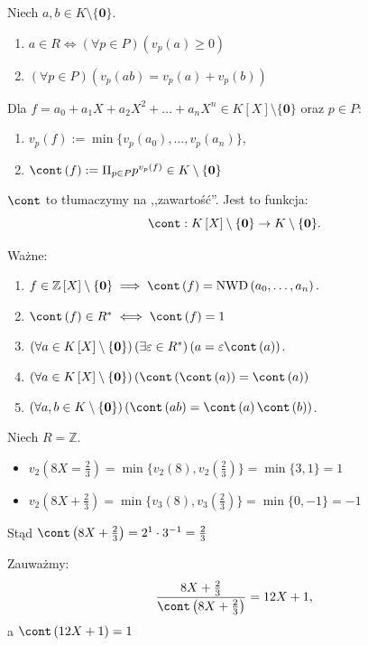 \begin{lemma}
	Niech $a,b \in K\setminus \{\mathbf{0}\} $.
	\begin{enumerate}[label=\arabic*)]
		\item $a\in R \iff \left(\forall p \in P \right)\left( v_{p}(a) \ge 0 \right)  $ 
		\item $\left(\forall p \in P \right)\left( v_{p}\left( ab \right) = v_{p}(a) + v_{p}(b) \right)  $
	\end{enumerate}
\end{lemma} 
\begin{definition}
	Dla $f = a_0 + a_1X + a_2X^2 + \ldots + a_{n} X^{n} \in K\left[ X \right] \setminus \{\mathbf{0}\} $ oraz $p \in P$:
	\begin{enumerate}[label=\arabic*)]
		\item $v_{p}\left( f \right) := \min \{v_{p}\left( a_0 \right) , \ldots, v_{p}\left( a_{n}  \right) \} $,
		\item $\cont\left( f \right) := \Pi_{p\in P} p^{v_{p}(f)} \in K\setminus \{\mathbf{0}\}  $
	\end{enumerate}
	$\cont$ to tłumaczymy na ,,zawartość''. Jest to funkcja:
	\[
	\cont: K\left[ X \right] \setminus \{\mathbf{0}\} \to K\setminus \{\mathbf{0}\} 
	.\] 
\end{definition} 
\begin{remark}
	Ważne:
	\begin{enumerate}[label=\roman*)]
		\item $f\in \mathbb{Z} \left[ X \right] \setminus \{\mathbf{0}\} \implies \cont\left( f \right) = \text{NWD}\left( a_0,\ldots,a_{n}  \right) .$
		\item $\cont\left( f \right) \in R^{\ast} \iff \cont\left( f \right) = 1$
		\item $\left(\forall a \in K\left[ X \right] \setminus \{\mathbf{0}\}  \right)\left(\exists \varepsilon \in R^{\ast}  \right)\left( a = \varepsilon \cont \left( a \right)  \right)   $.
		\item $\left(\forall a \in K\left[ X \right] \setminus \{\mathbf{0}\}  \right)\left( \cont \left( \cont \left( a \right)  \right) = \cont \left( a \right)  \right)  $
		\item $\left(\forall a,b \in K\setminus \{\mathbf{0}\}  \right)\left( \cont \left( ab \right) = \cont \left( a \right) \cont \left( b \right)  \right)  $.
	\end{enumerate}
\end{remark} 
\begin{eg}
	Niech $R = \mathbb{Z} $.
	\begin{itemize}
		\item $v_2\left( 8X = \frac{2}{3} \right) = \min \{v_2\left( 8 \right) , v_2\left( \frac{2}{3} \right) \} = \min \{3,1\} = 1$
		\item $v_2\left( 8X + \frac{2}{3} \right) = \min \{v_3\left( 8 \right) , v_3\left( \frac{2}{3} \right) \} = \min \{0, -1\} = -1$
	\end{itemize}
	Stąd $\cont \left( 8X + \frac{2}{3} \right) = 2^{1}\cdot 3^{-1} = \frac{2}{3}$ 
	
	Zauważmy: 
	\[
		\frac{8X + \frac{2}{3}}{\cont \left( 8X + \frac{2}{3} \right) } = 12X + 1 
	,\]
	a $\cont \left( 12X + 1 \right) = 1$
\end{eg} 
